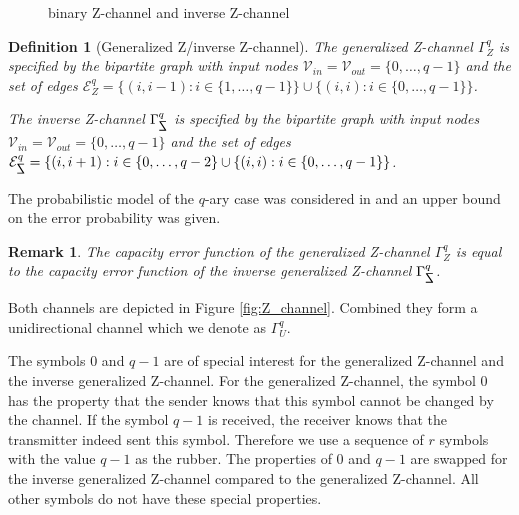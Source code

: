 \documentclass[conference]{IEEEtran}
\newtheorem{Definition}{Definition}
\newtheorem{Remark}{Remark}
\begin{document}
\begin{figure}
	\centering
	\caption{binary Z-channel and inverse Z-channel}
	\label{fig:binary_Z_channel}
\end{figure}


\begin{Definition}[Generalized Z/inverse Z-channel]
	The generalized Z-channel $\Gamma_Z^q$ is specified by the bipartite graph with input nodes $\mathcal{V}_{in} = \mathcal{V}_{out} = \{0,\dots, q-1\}$ and the set of edges $\mathcal{E}^q_Z = \{(i,i-1) : i \in \{1,\dots,q-1\}\} \cup \{(i,i) : i \in \{0,\dots,q-1  \}\}$.
	
	The inverse Z-channel $\Gamma_{\reflectbox{$\mathsf{Z}$}}^q$ is specified by the bipartite graph with input nodes $\mathcal{V}_{in} = \mathcal{V}_{out} = \{0,\dots, q-1\}$ and the set of edges $\mathcal{E}^q_{\reflectbox{$\mathsf{Z}$}} = \{(i,i+1) : i \in \{0,\dots,q-2\} \cup \{(i,i) : i \in \{0,\dots,q-1 \}  \}$.
\end{Definition}

The probabilistic model of the $q$-ary case was considered in \cite{D75} and an upper bound on the error probability was given.

\begin{Remark}\label{rem:Z_inverse_Z}
	The capacity error function of the generalized Z-channel $\Gamma_Z^q$ is equal to the capacity error function of the inverse generalized Z-channel $\Gamma_{\reflectbox{$\mathsf{Z}$}}^q$.
\end{Remark}

Both channels are depicted in Figure \ref{fig:Z_channel}. Combined they form a unidirectional channel which we denote as $\Gamma_{U}^q$.

The symbols $0$ and $q-1$ are of special interest for the generalized Z-channel and the inverse generalized Z-channel. For the generalized Z-channel, the symbol $0$ has the property that the sender knows that this symbol cannot be changed by the channel. If the symbol $q-1$ is received, the receiver knows that the transmitter indeed sent this symbol. Therefore we use a sequence of $r$ symbols with the value $q-1$ as the rubber. The properties of $0$ and $q-1$ are swapped for the inverse generalized Z-channel compared to the generalized Z-channel. All other symbols do not have these special properties.
\end{document}
